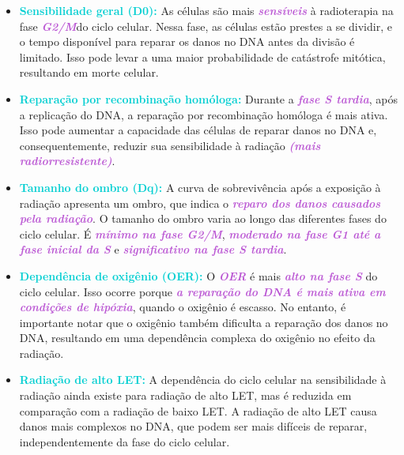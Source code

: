 \documentclass[11pt,a4paper]{article}
\begin{document}
	\begin{itemize}
		\item \textcolor{DarkTurquoise}{\textbf{Sensibilidade geral (D0):}} As células são mais \textcolor{MediumOrchid}{\textbf{\textit{sensíveis}}} à radioterapia na fase \textcolor{MediumOrchid}{\textbf{\textit{G2/M}}}do ciclo celular. Nessa fase, as células estão prestes a se dividir, e o tempo disponível para reparar os danos no DNA antes da divisão é limitado. Isso pode levar a uma maior probabilidade de catástrofe mitótica, resultando em morte celular.

		\item \textcolor{DarkTurquoise}{\textbf{Reparação por recombinação homóloga:}} Durante a \textcolor{MediumOrchid}{\textbf{\textit{fase S tardia}}}, após a replicação do DNA, a reparação por recombinação homóloga é mais ativa. Isso pode aumentar a capacidade das células de reparar danos no DNA e, consequentemente, reduzir sua sensibilidade à radiação \textcolor{MediumOrchid}{\textbf{\textit{(mais radiorresistente)}}}.

		\item \textcolor{DarkTurquoise}{\textbf{Tamanho do ombro (Dq):}} A curva de sobrevivência após a exposição à radiação apresenta um ombro, que indica o \textcolor{MediumOrchid}{\textbf{\textit{reparo dos danos causados pela radiação}}}. O tamanho do ombro varia ao longo das diferentes fases do ciclo celular. É \textcolor{MediumOrchid}{\textbf{\textit{mínimo na fase G2/M}}}, \textcolor{MediumOrchid}{\textbf{\textit{moderado na fase G1 até a fase inicial da S}}} e \textcolor{MediumOrchid}{\textbf{\textit{significativo na fase S tardia}}}.

		\item \textcolor{DarkTurquoise}{\textbf{Dependência de oxigênio (OER):}} O \textcolor{MediumOrchid}{\textbf{\textit{OER}}} é mais \textcolor{MediumOrchid}{\textbf{\textit{alto na fase S}}} do ciclo celular. Isso ocorre porque \textcolor{MediumOrchid}{\textbf{\textit{a reparação do DNA é mais ativa em condições de hipóxia}}}, quando o oxigênio é escasso. No entanto, é importante notar que o oxigênio também dificulta a reparação dos danos no DNA, resultando em uma dependência complexa do oxigênio no efeito da radiação.

		\item \textcolor{DarkTurquoise}{\textbf{Radiação de alto LET:}} A dependência do ciclo celular na sensibilidade à radiação ainda existe para radiação de alto LET, mas é reduzida em comparação com a radiação de baixo LET. A radiação de alto LET causa danos mais complexos no DNA, que podem ser mais difíceis de reparar, independentemente da fase do ciclo celular.
	\end{itemize}
\end{document}
